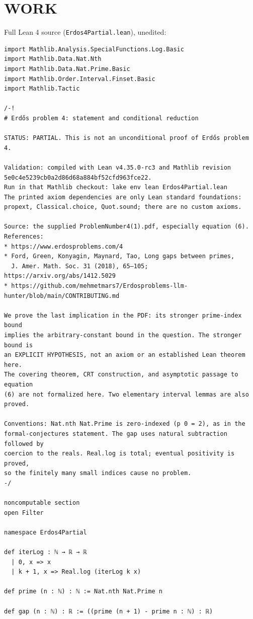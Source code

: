 \section{WORK}
Full Lean 4 source (\texttt{Erdos4Partial.lean}), unedited:
\begin{verbatim}
import Mathlib.Analysis.SpecialFunctions.Log.Basic
import Mathlib.Data.Nat.Nth
import Mathlib.Data.Nat.Prime.Basic
import Mathlib.Order.Interval.Finset.Basic
import Mathlib.Tactic

/-!
# Erdős problem 4: statement and conditional reduction

STATUS: PARTIAL. This is not an unconditional proof of Erdős problem 4.

Validation: compiled with Lean v4.35.0-rc3 and Mathlib revision
5e0c4e5239cb0a2d86d68a884bf52cfd963fce22.
Run in that Mathlib checkout: lake env lean Erdos4Partial.lean
The printed axiom dependencies are only Lean standard foundations:
propext, Classical.choice, Quot.sound; there are no custom axioms.

Source: the supplied ProblemNumber4(1).pdf, especially equation (6).
References:
* https://www.erdosproblems.com/4
* Ford, Green, Konyagin, Maynard, Tao, Long gaps between primes,
  J. Amer. Math. Soc. 31 (2018), 65–105; https://arxiv.org/abs/1412.5029
* https://github.com/mehmetmars7/Erdosproblems-llm-hunter/blob/main/CONTRIBUTING.md

We prove the last implication in the PDF: its stronger prime-index bound
implies the arbitrary-constant bound in the question. The stronger bound is
an EXPLICIT HYPOTHESIS, not an axiom or an established Lean theorem here.
The covering theorem, CRT construction, and asymptotic passage to equation
(6) are not formalized here. Two elementary interval lemmas are also proved.

Conventions: Nat.nth Nat.Prime is zero-indexed (p 0 = 2), as in the
formal-conjectures statement. The gap uses natural subtraction followed by
coercion to the reals. Real.log is total; eventual positivity is proved,
so the finitely many small indices cause no problem.
-/

noncomputable section
open Filter

namespace Erdos4Partial

def iterLog : ℕ → ℝ → ℝ
  | 0, x => x
  | k + 1, x => Real.log (iterLog k x)

def prime (n : ℕ) : ℕ := Nat.nth Nat.Prime n

def gap (n : ℕ) : ℝ := ((prime (n + 1) - prime n : ℕ) : ℝ)


\end{verbatim}
